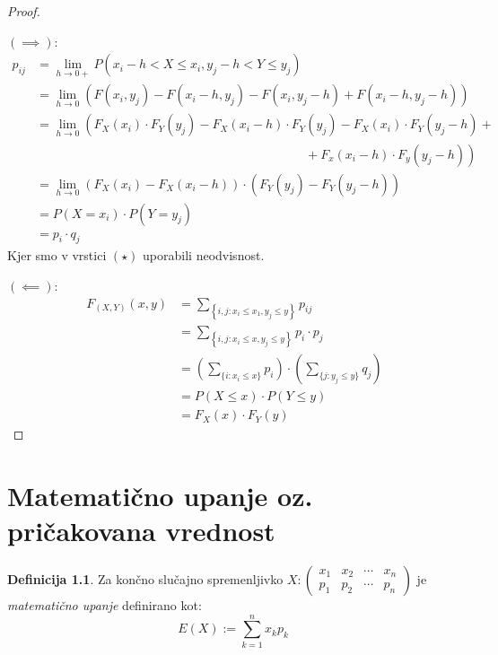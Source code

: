 \documentclass[12pt]{book}
\def\n{\noindent}
\def\s{\vspace{10pt}}
\theoremstyle{definition}
\newtheorem{definicija}{Definicija}
\theoremstyle{plain}
\theoremstyle{plain}
\theoremstyle{plain}
\theoremstyle{remark}
\begin{document}
\begin{proof}
    ~

    \n $(\implies)$:
    \begin{align*}
        p_{i j}&=\lim _{h \to 0+} P\left(x_i-h<X \leq x_i, y_j-h< Y \leq y_j\right) \\
        &=\lim _{h \to 0}\left(F\left(x_i, y_j\right)-F\left(x_i-h, y_j\right)-F\left(x_i, y_j-h\right) +F\left(x_i-h, y_j-h\right)\right) \\
        &=\lim _{h \to 0}\left(F_X\left(x_i\right) \cdot F_Y\left(y_j\right)-F_X\left(x_i-h\right) \cdot F_Y\left(y_j\right)-F_X\left(x_i\right) \cdot F_Y\left(y_j-h\right) \right. + \tag{$\star$} \\
        & \hspace{9cm} +\left. F_x\left(x_i-h\right) \cdot F_y\left(y_j-h\right)\right) \\
        &=\lim_{h \to 0}\left(F_X\left(x_i\right)-F_X\left(x_i-h\right)\right) \cdot\left(F_Y\left(y_j\right)-F_Y\left(y_j-h\right)\right) \\
        &=P\left(X=x_i\right) \cdot P\left(Y=y_j\right) \\
        &=p_i \cdot q_j
    \end{align*}
    Kjer smo v vrstici $(\star)$ uporabili neodvisnost. \s

    \n $(\impliedby)$:
    \begin{align*}
        \quad F_{(X, Y)}(x, y)&=\sum_{\left\{i,j: x_i \leq x_1,y_j \leq y\right\}} p_{i j} & \\
        &=\sum_{\left\{i,j: x_i \leq x,y_j \leq y\right\}} p_i \cdot p_j & \\
        &=\left(\sum_{\{i: x_i \leq x\}} p_i\right) \cdot \left(\sum_{\{j: y_j \leq y\}} q_j\right) & \\
        &=P(X \leq x) \cdot P(Y \leq y) & \\
        &=F_X(x) \cdot F_Y(y) &
    \end{align*}
\end{proof}

\chapter[Matematično upanje oz. pričakovana vrednost]{Matematično upanje oz.\\pričakovana vrednost}

\begin{definicija}
    Za končno slučajno spremenljivko 
    $X:\left(\begin{array}{llll}
    x_1 & x_2 & \cdots & x_n \\
    p_1 & p_2 & \cdots & p_n
    \end{array}\right)$
    je \emph{matematično upanje} definirano kot: 
    $$
    E(X):=\sum_{k=1}^n x_k p_k
    $$
\end{definicija}
\end{document}
